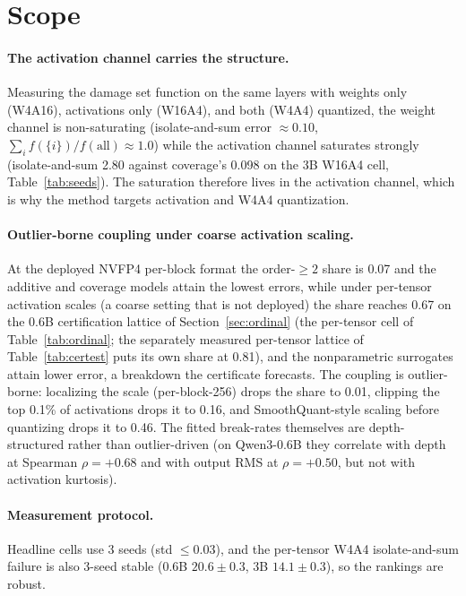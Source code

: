 \section{Scope}\label{sec:scope}

\paragraph{The activation channel carries the structure.} Measuring the damage set function on the
same layers with weights only (W4A16), activations only (W16A4), and both (W4A4) quantized, the weight
channel is non-saturating (isolate-and-sum error $\approx 0.10$, $\sum_i f(\{i\})/f(\text{all}) \approx 1.0$)
while the activation channel saturates strongly (isolate-and-sum 2.80 against coverage's 0.098 on the
3B W16A4 cell, Table~\ref{tab:seeds}). The saturation therefore lives in the activation channel,
which is why the method targets activation and W4A4 quantization.

\paragraph{Outlier-borne coupling under coarse activation scaling.} At the deployed NVFP4 per-block
format the order-$\ge 2$ share is 0.07 and the additive and coverage models attain the lowest errors,
while under per-tensor activation scales (a coarse setting that is not deployed) the share reaches
0.67 on the 0.6B certification lattice of Section~\ref{sec:ordinal} (the per-tensor cell of
Table~\ref{tab:ordinal}; the separately measured per-tensor lattice of Table~\ref{tab:certest}
puts its own share at 0.81), and the
nonparametric surrogates attain lower error, a breakdown the certificate forecasts. The coupling is
outlier-borne: localizing the scale (per-block-256)
drops the share to 0.01, clipping the top 0.1\% of activations drops it to 0.16, and SmoothQuant-style
scaling before quantizing drops it to 0.46. The fitted break-rates themselves are depth-structured
rather than outlier-driven (on Qwen3-0.6B they correlate with depth at Spearman $\rho = +0.68$ and
with output RMS at $\rho = +0.50$, but not with activation kurtosis). 

\paragraph{Measurement protocol.} Headline cells use 3 seeds (std $\le 0.03$), and the per-tensor
W4A4 isolate-and-sum failure is also 3-seed stable (0.6B $20.6\pm 0.3$, 3B $14.1\pm 0.3$), so the
rankings are robust.


